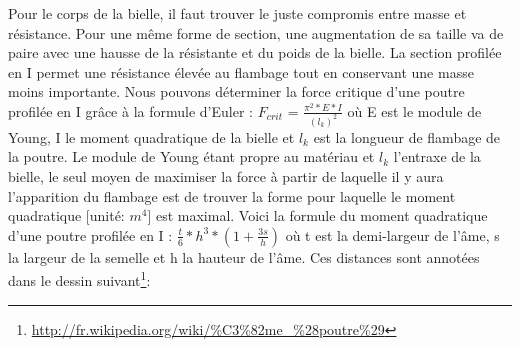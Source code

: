 \documentclass[a4paper,oneside,12pt]{report}
\begin{document}
 Pour le corps de la bielle, il faut trouver le juste compromis entre masse et résistance. Pour une même forme de section, une augmentation de sa taille va de paire avec une hausse de la résistante et du poids de la bielle. La section profilée en I permet une résistance élevée au flambage tout en conservant une masse moins importante. Nous pouvons déterminer la force critique d'une poutre profilée en I grâce à la formule d'Euler : $F_{crit}$ = $\frac{\pi^2 *E*I}{(l_k)^2}$ où E est le module de Young, I le moment quadratique de la bielle et $l_k$ est la longueur de flambage de la poutre. Le module de Young étant propre au matériau et $l_k$ l'entraxe de la bielle, le seul moyen de maximiser la force à partir de laquelle il y aura l'apparition du flambage est de trouver la forme pour laquelle le moment quadratique [unité: $m^4$] est maximal. Voici la formule du moment quadratique d'une poutre profilée en I : $\frac{t}{6}*h^3*(1+\frac{3s}{h})$ où t est la demi-largeur de l'âme, s la largeur de la semelle et h la hauteur de l'âme. Ces distances sont annotées dans le dessin suivant\footnote{\url{http://fr.wikipedia.org/wiki/\%C3\%82me_\%28poutre\%29}}:
\end{document}
